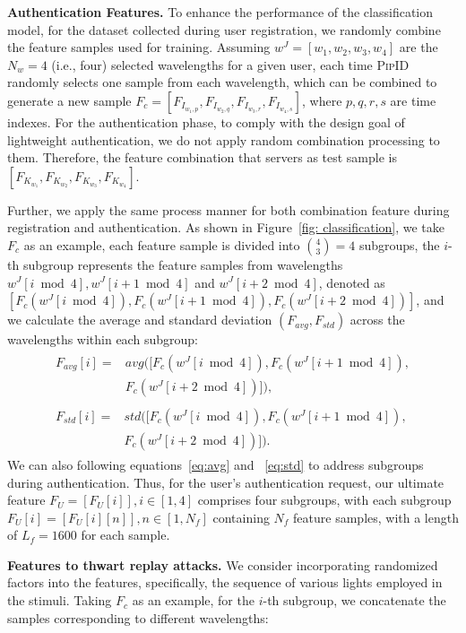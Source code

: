 \documentclass[sigconf]{acmart}
\newcommand{\sysname}{\textsc{PipID}\xspace}
\begin{document}
\textbf{Authentication Features.}
To enhance the performance of the classification model, for the dataset collected during user registration, we randomly combine the feature samples used for training. Assuming $w^J = [w_1, w_2, w_3, w_4]$ are the $N_w=4$ (i.e., four) selected wavelengths for a given user, each time \sysname randomly selects one sample from each wavelength, which can be combined to generate a new sample $F_c = [F_{I_{w_1,p}}, F_{I_{w_2,q}}, F_{I_{w_3,r}}, F_{I_{w_4,s}}]$, where $p,q,r,s$ are time indexes. For the authentication phase, to comply with the design goal of lightweight authentication, we do not apply random combination processing to them. Therefore, the feature combination that servers as test sample is $[F_{K_{w_1}},F_{K_{w_2}},F_{K_{w_3}},F_{K_{w_4}}]$.

Further, we apply the same process manner for both combination feature during registration and authentication. As shown in Figure~\ref{fig: classification}, we take $F_c$ as an example, each feature sample is divided into $\binom{4}{3} = 4$ subgroups, the $i$-th subgroup represents the feature samples from wavelengths $w^J[i\bmod 4], w^J[i+1\bmod 4]$ and $w^J[i+2\bmod 4]$, denoted as $[F_c(w^J[i\bmod 4]), F_c(w^J[i+1\bmod 4]), F_c(w^J[i+2\bmod 4])]$, and we calculate the average and standard deviation $(F_{avg}, F_{std})$ across the wavelengths within each subgroup:
\begin{eqnarray}
\begin{split}
 \label{eq:avg}
    F_{avg}[i] = &avg([F_c(w^J[i\bmod 4]), F_c(w^J[i+1\bmod 4]), \\
    &F_c(w^J[i+2\bmod 4])]),   
\end{split}
 \\ 
\begin{split}
   \label{eq:std}
    F_{std}[i] = &std([F_c(w^J[i\bmod 4]), F_c(w^J[i+1\bmod 4]), \\
    &F_c(w^J[i+2\bmod 4])]).  
\end{split}
\end{eqnarray}
We can also following equations~\ref{eq:avg} and ~\ref{eq:std} to address subgroups during authentication. Thus, for the user's authentication request, our ultimate feature $F_U = [F_U[i]], i\in[1,4]$ comprises four subgroups, with each subgroup $F_U[i] = [F_U[i][n]], n\in[1,N_f]$ containing $N_f$ feature samples, with a length of $L_f = 1600$ for each sample.


\textbf{Features to thwart replay attacks.}
We consider incorporating randomized factors into the features, specifically, the sequence of various lights employed in the stimuli. Taking $F_c$ as an example, for the $i$-th subgroup, we concatenate the samples corresponding to different wavelengths:
\end{document}
